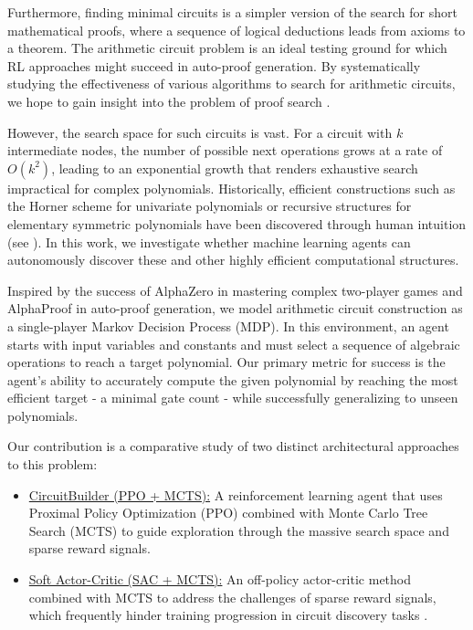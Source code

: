 \documentclass{article} %
\begin{document}
Furthermore, finding minimal circuits is a simpler version of the search for short mathematical proofs, where a sequence of logical deductions leads from axioms to a theorem. The arithmetic circuit problem is an ideal testing ground for which RL approaches might succeed in auto-proof generation. By systematically studying the effectiveness of various algorithms to search for arithmetic circuits, we hope to gain insight into the problem of proof search \citep{Hubert2025AlphaProof}.


However, the search space for such circuits is vast. For a circuit with $k$ intermediate nodes, the number of possible next operations grows at a rate of $O(k^{2})$, leading to an exponential growth that renders exhaustive search impractical for complex polynomials. Historically, efficient constructions such as the Horner scheme for univariate polynomials or recursive structures for elementary symmetric polynomials have been discovered through human intuition (see ). In this work, we investigate whether machine learning agents can autonomously discover these and other highly efficient computational structures.

Inspired by the success of AlphaZero \citep{Silveretal2018AlphaZero} in mastering complex two-player games and AlphaProof \citep{Hubert2025AlphaProof} in auto-proof generation, we model arithmetic circuit construction as a single-player Markov Decision Process (MDP). In this environment, an agent starts with input variables and constants and must select a sequence of algebraic operations to reach a target polynomial. Our primary metric for success is the agent's ability to accurately compute the given polynomial by reaching the most efficient target - a minimal gate count - while successfully generalizing to unseen polynomials.

Our contribution is a comparative study of two distinct architectural approaches to this problem:
\begin{itemize}
    \item \underline{CircuitBuilder (PPO + MCTS):} A reinforcement learning agent that uses Proximal Policy Optimization (PPO) combined with Monte Carlo Tree Search (MCTS) to guide exploration through the massive search space and sparse reward signals.
    \item \underline{Soft Actor-Critic (SAC + MCTS):} An off-policy actor-critic method combined with MCTS to address the challenges of sparse reward signals, which frequently hinder training progression in circuit discovery tasks \citep{Haarnoja2018SAC}.
\end{itemize}
\end{document}
